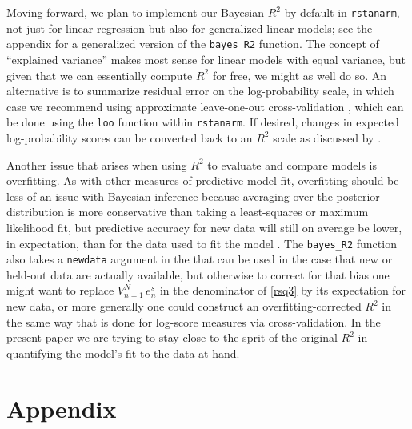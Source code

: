\documentclass[11pt]{article}
\begin{document}
Moving forward, we plan to implement our Bayesian $R^2$ by default in
{\tt rstanarm}, not just for linear regression but also for generalized linear
models; see the appendix for a generalized version of the
\verb#bayes_R2# function. The concept of ``explained variance'' makes most
sense for linear models with equal variance, but given that we can essentially
compute $R^2$ for free, we might as well do so.  An alternative is to summarize
residual error on the log-probability scale, in which case we recommend using
approximate leave-one-out cross-validation \citep{VehtariGelmanGabry2017},
which can be done using the {\tt loo} function within {\tt rstanarm}.
If desired, changes in expected log-probability scores can be converted back to
an $R^2$ scale as discussed by \cite{Nagelkerke1991}.

Another issue that arises when using $R^2$ to evaluate and compare models is
overfitting.  As with other measures of predictive model fit, overfitting should
be less of an issue with Bayesian inference because averaging over the posterior
distribution is more conservative than taking a least-squares or maximum
likelihood fit, but predictive accuracy for new data will still on average be
lower, in expectation, than for the data used to fit the model
\citep{GelmanHwangVehtari2014}. The \verb#bayes_R2# function also takes a 
{\tt newdata} argument in the that can be used in the case that new or held-out data
are actually available, but otherwise to correct for that bias one might want to
replace $V_{n=1}^N \,e_n^s$ in the denominator of \eqref{rsq3} by its expectation
for new data, or more generally one could construct an overfitting-corrected
$R^2$ in the same way that is done for log-score measures via cross-validation.
In the present paper we are trying to stay close to the sprit of the original
$R^2$ in quantifying the model's fit to the data at hand.







\clearpage
\section*{Appendix}
\end{document}

